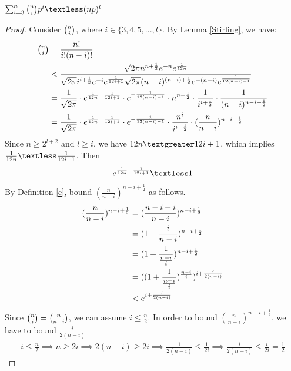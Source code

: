 \begin{claim}
$\sum_{i=3}^{n}\tbinom{n}{i}p^i\textless (np)^l$
\end{claim}
\begin{proof}
Consider $\tbinom{n}{i}$, where $i\in\{3,4,5,...,l\}$. By Lemma \ref{Stirling}, we have:
\begin{align}
   \nonumber\tbinom{n}{i}&=\frac{n!}{i!(n-i)!}\\
    \nonumber&\textless \frac{\sqrt{2\pi}n^{n+\frac{1}{2}}e^{-n}e^{\frac{1}{12n}}}{\sqrt{2\pi}i^{i+\frac{1}{2}}e^{-i}e^{\frac{1}{12i+1}}\sqrt{2\pi}(n-i)^{(n-i)+\frac{1}{2}}e^{-(n-i)}e^{\frac{1}{12(n-i)+1}}}\\
    \nonumber &=\frac{1}{\sqrt{2\pi}}\cdot e^{\frac{1}{12n}-\frac{1}{12i+1}}\cdot e^{-\frac{1}{12(n-i)-1}} \cdot n^{n+\frac{1}{2}} \cdot \frac{1}{i^{i+\frac{1}{2}}} \cdot \frac{1}{(n-i)^{n-i+\frac{1}{2}}}\\
    &=\frac{1}{\sqrt{2\pi}}\cdot e^{\frac{1}{12n}-\frac{1}{12i+1}}\cdot e^{-\frac{1}{12(n-i)-1}} \cdot \frac{n^i}{i^{i+\frac{1}{2}}} \cdot (\frac{n}{n-i})^{n-i+\frac{1}{2}}\label{a}
\end{align}
Since $n\ge 2^{l+2}$ and $l\ge i$, we have $12n \textgreater 12i+1$, which implies $\frac{1}{12n} \textless \frac{1}{12i+1}$. Then
\begin{align}
     e^{\frac{1}{12n}-\frac{1}{12i+1}} \textless 1 \label{b}
\end{align}
By Definition \ref{e}, bound $(\frac{n}{n-i})^{n-i+\frac{1}{2}}$ as follows.
\begin{align}
    \nonumber (\frac{n}{n-i})^{n-i+\frac{1}{2}}
    &= (\frac{n-i+i}{n-i})^{n-i+\frac{1}{2}}\\
    \nonumber&= (1+\frac{i}{n-i})^{n-i+\frac{1}{2}}\\
    \nonumber&= (1+\frac{1}{\frac{n-i}{i}})^{n-i+\frac{1}{2}}\\
    \nonumber&= ((1+\frac{1}{\frac{n-i}{i}})^{\frac{n-i}{i}})^{i+\frac{i}{2(n-i)}}\\
    \nonumber &\textless e^{i+\frac{i}{2(n-i)}}
\end{align}
Since $\tbinom{n}{i}=\tbinom{n}{n-i}$, 
we can assume $i\le \frac{n}{2}$. 
In order to bound $(\frac{n}{n-i})^{n-i+\frac{1}{2}}$, we have to bound $\frac{i}{2(n-i)}$
\begin{align}
   \nonumber i\le \frac{n}{2} 
   \implies n \ge 2i 
   \implies 2(n-i) \ge 2i \implies \frac{1}{2(n-i)} \le \frac{1}{2i} \implies  \frac{i}{2(n-i)} \le \frac{i}{2i} =\frac{1}{2}

\end{align}
\end{proof}
